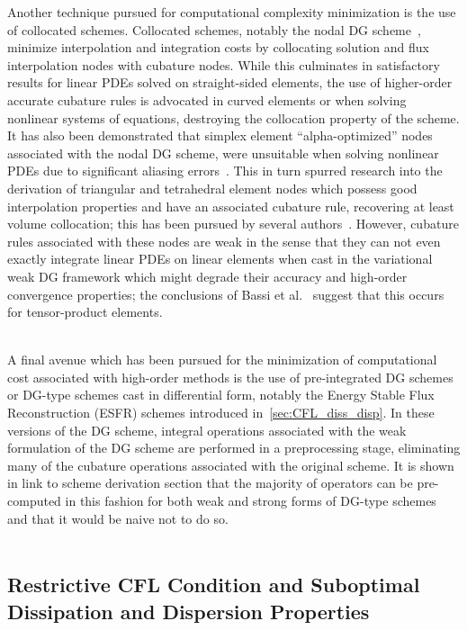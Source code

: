 \documentclass[12pt,Bold,letterpaper,TexShade]{mcgilletdclass}
\numberwithin{equation}{section}
\begin{document}
Another technique pursued for computational complexity minimization is the use of collocated schemes. Collocated schemes, notably the nodal DG scheme~\cite{hesthaven2002,hesthaven2007}, minimize interpolation and integration costs by collocating solution and flux interpolation nodes with cubature nodes. While this culminates in satisfactory results for linear PDEs solved on straight-sided elements, the use of higher-order accurate cubature rules is advocated in curved elements or when solving nonlinear systems of equations, destroying the collocation property of the scheme. It has also been demonstrated that simplex element ``alpha-optimized'' nodes~\cite{warburton2006} associated with the nodal DG scheme, were unsuitable when solving nonlinear PDEs due to significant aliasing errors~\cite{witherden2014}. This in turn spurred research into the derivation of triangular and tetrahedral element nodes which possess good interpolation properties and have an associated cubature rule, recovering at least volume collocation; this has been pursued by several authors~\cite{witherden2014,williams2014b,shunn2012}. However, cubature rules associated with these nodes are weak in the sense that they can not even exactly integrate linear PDEs on linear elements when cast in the variational weak DG framework which might degrade their accuracy and high-order convergence properties; the conclusions of Bassi et al.~\cite{bassi2013} suggest that this occurs for tensor-product elements.
\\~

A final avenue which has been pursued for the minimization of computational cost associated with high-order methods is the use of pre-integrated DG schemes~\cite{atkins1996} or DG-type schemes cast in differential form, notably the Energy Stable Flux Reconstruction (ESFR) schemes introduced in~\autoref{sec:CFL_diss_disp}. In these versions of the DG scheme, integral operations associated with the weak formulation of the DG scheme are performed in a preprocessing stage, eliminating many of the cubature operations associated with the original scheme. It is shown in {\color{red} link to scheme derivation section} that the majority of operators can be pre-computed in this fashion for both weak and strong forms of DG-type schemes and that it would be naive not to do so.
\\~

\subsection{Restrictive CFL Condition and Suboptimal Dissipation and Dispersion Properties}
\label{sec:CFL_diss_disp}
\end{document}
